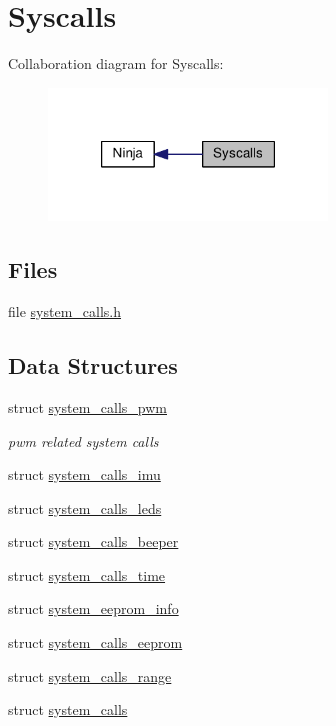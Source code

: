 \hypertarget{group__syscalls}{\section{Syscalls}
\label{group__syscalls}
}
Collaboration diagram for Syscalls\+:\nopagebreak
\begin{figure}[H]
\begin{center}
\leavevmode
\includegraphics[width=210pt]{group__syscalls}
\end{center}
\end{figure}
\subsection*{Files}
\begin{DoxyCompactItemize}
\item 
file \hyperlink{system__calls_8h}{system\+\_\+calls.\+h}
\end{DoxyCompactItemize}
\subsection*{Data Structures}
\begin{DoxyCompactItemize}
\item 
struct \hyperlink{structsystem__calls__pwm}{system\+\_\+calls\+\_\+pwm}
\begin{DoxyCompactList}\small\item\em pwm related system calls \end{DoxyCompactList}\item 
struct \hyperlink{structsystem__calls__imu}{system\+\_\+calls\+\_\+imu}
\item 
struct \hyperlink{structsystem__calls__leds}{system\+\_\+calls\+\_\+leds}
\item 
struct \hyperlink{structsystem__calls__beeper}{system\+\_\+calls\+\_\+beeper}
\item 
struct \hyperlink{structsystem__calls__time}{system\+\_\+calls\+\_\+time}
\item 
struct \hyperlink{structsystem__eeprom__info}{system\+\_\+eeprom\+\_\+info}
\item 
struct \hyperlink{structsystem__calls__eeprom}{system\+\_\+calls\+\_\+eeprom}
\item 
struct \hyperlink{structsystem__calls__range}{system\+\_\+calls\+\_\+range}
\item 
struct \hyperlink{structsystem__calls}{system\+\_\+calls}
\end{DoxyCompactItemize}
